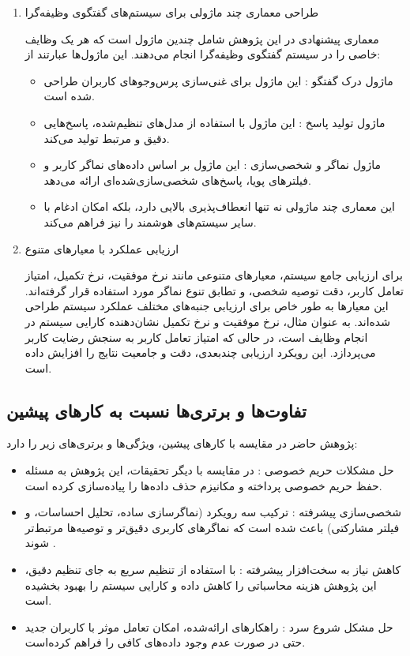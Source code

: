 \begin{enumerate}
\item
طراحی معماری چند ماژولی برای سیستم‌های گفتگوی وظیفه‌گرا

معماری پیشنهادی در این پژوهش شامل چندین ماژول است که هر یک وظایف خاصی را در سیستم گفتگوی وظیفه‌گرا انجام می‌دهند. این ماژول‌ها عبارتند از:
\begin{itemize}
\item
ماژول درک گفتگو : این ماژول برای غنی‌سازی پرس‌وجوهای کاربران طراحی شده است.
\item
ماژول تولید پاسخ : این ماژول با استفاده از مدل‌های تنظیم‌شده، پاسخ‌هایی دقیق و مرتبط تولید می‌کند.
\item
ماژول نماگر و شخصی‌سازی : این ماژول بر اساس داده‌های نماگر کاربر و فیلترهای پویا، پاسخ‌های شخصی‌سازی‌شده‌ای ارائه می‌دهد.

\item
این معماری چند ماژولی نه تنها انعطاف‌پذیری بالایی دارد، بلکه امکان ادغام با سایر سیستم‌های هوشمند را نیز فراهم می‌کند.
\end{itemize}

\item

ارزیابی عملکرد با معیارهای متنوع

برای ارزیابی جامع سیستم، معیارهای متنوعی مانند نرخ موفقیت، نرخ تکمیل، امتیاز تعامل کاربر، دقت توصیه شخصی، و تطابق تنوع نماگر مورد استفاده قرار گرفته‌اند. این معیارها به طور خاص برای ارزیابی جنبه‌های مختلف عملکرد سیستم طراحی شده‌اند. به عنوان مثال، نرخ موفقیت و نرخ تکمیل نشان‌دهنده کارایی سیستم در انجام وظایف است، در حالی که امتیاز تعامل کاربر به سنجش رضایت کاربر می‌پردازد. این رویکرد ارزیابی چندبعدی، دقت و جامعیت نتایج را افزایش داده است.
\end{enumerate}

\subsection{تفاوت‌ها و برتری‌ها نسبت به کارهای پیشین}
پژوهش حاضر در مقایسه با کارهای پیشین، ویژگی‌ها و برتری‌های زیر را دارد:
\begin{itemize}
\item
حل مشکلات حریم خصوصی : در مقایسه با دیگر تحقیقات، این پژوهش به مسئله حفظ حریم خصوصی پرداخته و مکانیزم حذف داده‌ها را پیاده‌سازی کرده است.
\item
شخصی‌سازی پیشرفته : ترکیب سه رویکرد (نماگر‌سازی ساده، تحلیل احساسات، و فیلتر مشارکتی) باعث شده است که نماگر‌های کاربری دقیق‌تر و توصیه‌ها مرتبط‌تر شوند .
\item
کاهش نیاز به سخت‌افزار پیشرفته : با استفاده از تنظیم سریع به جای تنظیم دقیق، این پژوهش هزینه محاسباتی را کاهش داده و کارایی سیستم را بهبود بخشیده است.
\item
حل مشکل شروع سرد : راهکارهای ارائه‌شده، امکان تعامل موثر با کاربران جدید حتی در صورت عدم وجود داده‌های کافی را فراهم کرده‌است.
\end{itemize}


